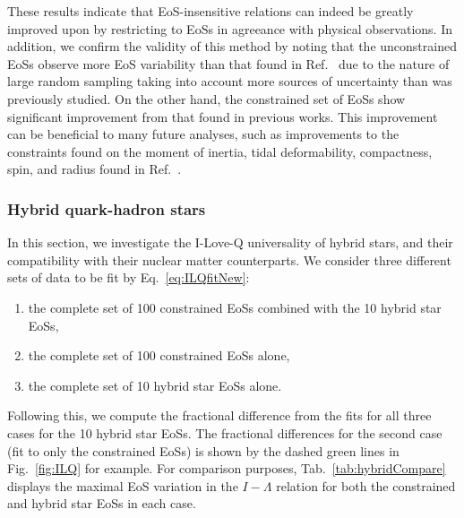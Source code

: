 \documentclass[prd,twocolumn,nofootinbib,superscriptaddress,amsmath,amssymb]{revtex4-1}
\begin{document}
These results indicate that EoS-insensitive relations can indeed be greatly improved upon by restricting to EoSs in agreeance with physical observations.
In addition, we confirm the validity of this method by noting that the unconstrained EoSs observe more EoS variability than that found in Ref.~\cite{Yagi:ILQ} due to the nature of large random sampling taking into account more sources of uncertainty than was previously studied.
On the other hand, the constrained set of EoSs show significant improvement from that found in previous works.
This improvement can be beneficial to many future analyses, such as improvements to the constraints found on the moment of inertia, tidal deformability, compactness, spin, and radius found in Ref.~\cite{Kumar:2019xgp}.

\subsubsection{Hybrid quark-hadron stars}\label{sec:ilq-hyb}
In this section, we investigate the I-Love-Q universality of hybrid stars, and their compatibility with their nuclear matter counterparts.
We consider three different sets of data to be fit by Eq.~\ref{eq:ILQfitNew}:
\begin{enumerate}
\item the complete set of 100 constrained EoSs combined with the 10 hybrid star EoSs,
\item the complete set of 100 constrained EoSs alone,
\item the complete set of 10 hybrid star EoSs alone.
\end{enumerate}
Following this, we compute the fractional difference from the fits for all three cases for the 10 hybrid star EoSs.
The fractional differences for the second case (fit to only the constrained EoSs) is shown by the dashed green lines in Fig.~\ref{fig:ILQ} for example.
For comparison purposes, Tab.~\ref{tab:hybridCompare} displays the maximal EoS variation in the $I-\Lambda$ relation for both the constrained and hybrid star EoSs in each case.
\end{document}
